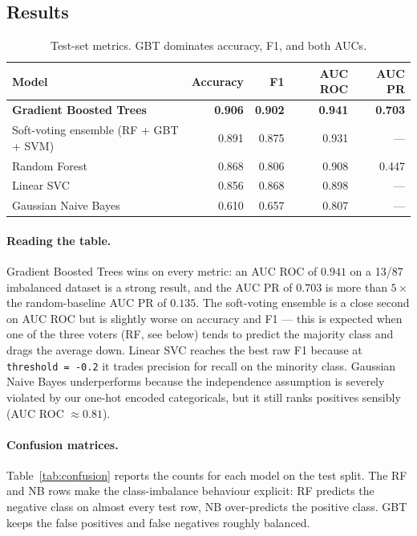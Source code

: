 \documentclass[11pt,a4paper]{article}
\begin{document}
\subsection{Results}
\label{sec:ml-results}

\begin{table}[h]
\centering
\caption{Test-set metrics. GBT dominates accuracy, F1, and both AUCs.}
\label{tab:metrics}
\small
\begin{tabular}{lrrrr}
\toprule
\textbf{Model} & \textbf{Accuracy} & \textbf{F1} & \textbf{AUC ROC} & \textbf{AUC PR} \\
\midrule
\textbf{Gradient Boosted Trees} & \textbf{0.906} & \textbf{0.902} & \textbf{0.941} & \textbf{0.703} \\
Soft-voting ensemble (RF + GBT + SVM) & 0.891 & 0.875 & 0.931 & --- \\
Random Forest & 0.868 & 0.806 & 0.908 & 0.447 \\
Linear SVC & 0.856 & 0.868 & 0.898 & --- \\
Gaussian Naive Bayes & 0.610 & 0.657 & 0.807 & --- \\
\bottomrule
\end{tabular}
\end{table}

\paragraph{Reading the table.}  Gradient Boosted Trees wins on every
metric: an AUC ROC of $0.941$ on a 13/87 imbalanced dataset is a
strong result, and the AUC PR of $0.703$ is more than $5\times$ the
random-baseline AUC PR of $0.135$.  The soft-voting ensemble is a
close second on AUC ROC but is slightly worse on accuracy and F1 ---
this is expected when one of the three voters (RF, see below) tends
to predict the majority class and drags the average down.  Linear
SVC reaches the best raw F1 because at \texttt{threshold = -0.2} it
trades precision for recall on the minority class.  Gaussian Naive
Bayes underperforms because the independence assumption is severely
violated by our one-hot encoded categoricals, but it still ranks
positives sensibly (AUC ROC $\approx 0.81$).

\paragraph{Confusion matrices.}  Table~\ref{tab:confusion} reports the
counts for each model on the test split.  The RF and NB rows make the
class-imbalance behaviour explicit: RF predicts the negative class on
almost every test row, NB over-predicts the positive class.  GBT
keeps the false positives and false negatives roughly balanced.
\end{document}
